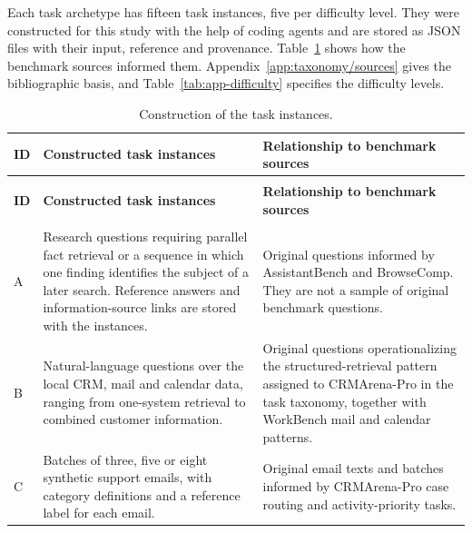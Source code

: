 Each task archetype has fifteen task instances, five per difficulty level. They were constructed for this study with the help of coding agents and are stored as JSON files with their input, reference and provenance. Table~\ref{tab:app-instance-construction} shows how the benchmark sources informed them. Appendix~\ref{app:taxonomy/sources} gives the bibliographic basis, and Table~\ref{tab:app-difficulty} specifies the difficulty levels.

\begingroup
\renewcommand{\baselinestretch}{1}
\small
\setlength{\tabcolsep}{4pt}
\renewcommand{\arraystretch}{1.08}
\begin{longtable}{>{\raggedright\arraybackslash}p{} >{\raggedright\arraybackslash}p{} >{\raggedright\arraybackslash}p{}}
\caption[Construction of the task instances]{Construction of the task instances.}\label{tab:app-instance-construction} \\
\toprule
\textbf{ID} & \textbf{Constructed task instances} & \textbf{Relationship to benchmark sources} \\
\midrule
\endfirsthead
\multicolumn{3}{l}{\tablename~\thetable{} (continued)} \\
\toprule
\textbf{ID} & \textbf{Constructed task instances} & \textbf{Relationship to benchmark sources} \\
\midrule
\endhead
\midrule
\multicolumn{3}{r}{\emph{Continued on the next page.}} \\
\endfoot
\bottomrule
\endlastfoot
A & Research questions requiring parallel fact retrieval or a sequence in which one finding identifies the subject of a later search. Reference answers and information-source links are stored with the instances. & Original questions informed by AssistantBench and BrowseComp. They are not a sample of original benchmark questions. \\
\addlinespace[2.5pt]
B & Natural-language questions over the local CRM, mail and calendar data, ranging from one-system retrieval to combined customer information. & Original questions operationalizing the structured-retrieval pattern assigned to CRMArena-Pro in the task taxonomy, together with WorkBench mail and calendar patterns. \\
\addlinespace[2.5pt]
C & Batches of three, five or eight synthetic support emails, with category definitions and a reference label for each email. & Original email texts and batches informed by CRMArena-Pro case routing and activity-priority tasks. \\

\end{longtable}
